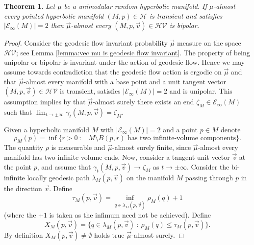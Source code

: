 \documentclass{amsart}
\newcommand{\Hypers}{\mathcal{H}}
\newcommand{\HypersV}{\mathcal{HV}}
\newcommand{\EndsInf}[1]{\mathcal{E}_{\infty}\left(#1\right)}
\theoremstyle{plain}
\newtheorem{theorem}{Theorem}[section]
\numberwithin{equation}{section}
\theoremstyle{definition}
\begin{document}
\begin{theorem}
\label{thm:two ended is bipolar}
Let $\mu$ be a unimodular random hyperbolic manifold. 
If $\mu$-almost every pointed hyperbolic manifold $(M,p) \in \Hypers$ is transient and satisfies $|\EndsInf{M}| = 2$ then $\vec \mu$-almost every $(M,p,\vec v) \in \HypersV$ is bipolar.
\end{theorem}
\begin{proof}
Consider the geodesic flow invariant probability 
$\vec \mu$ measure on the space $\HypersV$; see Lemma \ref{lemma:vec mu is geodesic flow invariant}.
The property of being unipolar or bipolar is invariant under the action of geodesic flow. Hence we may assume towards contradiction that the geodesic flow action is ergodic on $\vec \mu$ and that $\vec \mu$-almost every manifold with a base point and a unit tangent vector $(M,p,\vec v) \in \HypersV$ is transient, satisfies $|\EndsInf{M}|=2$ and is unipolar. 
This assumption implies by  that $\vec \mu$-almost surely there exists an end $\zeta_M \in \EndsInf{M}$ such that $\lim_{t\to\pm\infty}\gamma_t(M,p,\vec v) = \zeta_M$.

Given a hyperbolic manifold $M$ with $|\EndsInf{M}|=2$ and a point $p\in M$ denote 
$$ \rho_M(p) = \inf \{ r > 0 \: : \:  \text{ $M \setminus B(p,r)$ has  two infinite-volume components} \}.$$ 
The quantity $\rho$ is measurable and $\vec \mu$-almost surely finite, since $\vec \mu$-almost every manifold has two infinite-volume ends. Now, consider a tangent unit vector $\vec v$ at the point $p$, and assume that $\gamma_t(M,p,\vec v) \to \zeta_M$ as $t \to \pm \infty$.
Consider the bi-infinite locally geodesic path  $\lambda_M(p,\vec v)$ on the manifold $M$ passing through $p$ in the direction $\vec v$. Define 
$$\tau_M(p,\vec v) = \inf_{q \in \lambda_M(p,\vec v)}  \rho_M(q) + 1$$
(where the $+1$ is taken as the infimum need not be achieved).
Define
$$X_M(p,\vec v) = \{ q \in \lambda_M(p,\vec v) \: : \: \rho_M(q) \le \tau_M(p,\vec v)\}.$$
By definition $X_M(p,\vec v) \neq \emptyset$ holds true $\vec \mu$-almost surely. 


\end{proof}
\end{document}
